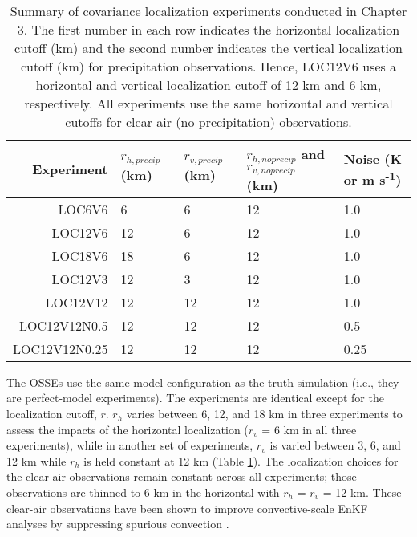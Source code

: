 \begin{table}
\centering
\begin{tabular}{ r || m{2.5cm} | m{2.5cm} | m{2.5cm} | m{2.5cm} }
Experiment  & \(r_{h, precip}\) (km) & \(r_{v, precip}\) (km) & \(r_{h, noprecip}\) and \(r_{v, noprecip}\) (km) & Noise (K or m s\textsuperscript{-1}) \\
\hline \hline
LOC6V6 & 6 & 6 & 12 & 1.0 \\
LOC12V6 & 12 & 6 & 12 & 1.0 \\
LOC18V6 & 18 & 6 & 12 & 1.0 \\
LOC12V3 & 12 & 3 & 12 & 1.0 \\
LOC12V12 & 12 & 12 & 12 & 1.0 \\
LOC12V12N0.5 & 12 & 12 & 12 & 0.5 \\
LOC12V12N0.25 & 12 & 12 & 12 & 0.25 \\
\end{tabular}
\caption{Summary of covariance localization experiments conducted in Chapter 3. The first number in each row indicates the horizontal localization cutoff (km) and the second number indicates the vertical localization cutoff (km) for precipitation observations. Hence, LOC12V6 uses a horizontal and vertical localization cutoff of 12 km and 6 km, respectively. All experiments use the same horizontal and vertical cutoffs for clear-air (no precipitation) observations.}
\label{exptable}
\end{table}

The OSSEs use the same model configuration as the truth simulation (i.e., they are perfect-model experiments). The experiments are identical except for the localization cutoff, \(r\).  \(r_h\) varies between 6, 12, and 18 km in three experiments to assess the impacts of the horizontal localization (\(r_v\)  = 6 km in all three experiments), while in another set of experiments, \(r_v\) is varied between 3, 6, and 12 km while \(r_h\) is held constant at 12 km (Table \ref{exptable}). The localization choices for the clear-air observations remain constant across all experiments; those observations are thinned to 6 km in the horizontal with \(r_h\) = \(r_v\) = 12 km. These clear-air observations have been shown to improve convective-scale EnKF analyses by suppressing spurious convection \citep{aksoyetal09}. 

